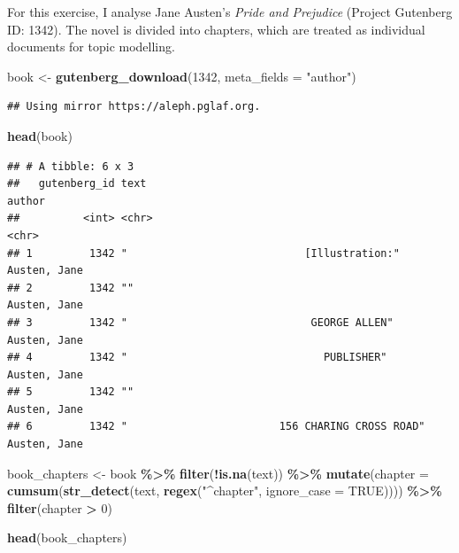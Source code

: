 \documentclass[
]{article}
\newenvironment{Shaded}{\begin{snugshade}}{\end{snugshade}}
\newcommand{\AttributeTok}[1]{\textcolor[rgb]{0.13,0.29,0.53}{#1}}
\newcommand{\ConstantTok}[1]{\textcolor[rgb]{0.56,0.35,0.01}{#1}}
\newcommand{\DecValTok}[1]{\textcolor[rgb]{0.00,0.00,0.81}{#1}}
\newcommand{\FunctionTok}[1]{\textcolor[rgb]{0.13,0.29,0.53}{\textbf{#1}}}
\newcommand{\NormalTok}[1]{#1}
\newcommand{\OtherTok}[1]{\textcolor[rgb]{0.56,0.35,0.01}{#1}}
\newcommand{\SpecialCharTok}[1]{\textcolor[rgb]{0.81,0.36,0.00}{\textbf{#1}}}
\newcommand{\StringTok}[1]{\textcolor[rgb]{0.31,0.60,0.02}{#1}}
\begin{document}
For this exercise, I analyse Jane Austen's \emph{Pride and Prejudice}
(Project Gutenberg ID: 1342). The novel is divided into chapters, which
are treated as individual documents for topic modelling.

\begin{Shaded}
\begin{Highlighting}[]
\NormalTok{book }\OtherTok{\textless{}{-}} \FunctionTok{gutenberg\_download}\NormalTok{(}\DecValTok{1342}\NormalTok{, }\AttributeTok{meta\_fields =} \StringTok{"author"}\NormalTok{)}
\end{Highlighting}
\end{Shaded}

\begin{verbatim}
## Using mirror https://aleph.pglaf.org.
\end{verbatim}

\begin{Shaded}
\begin{Highlighting}[]
\FunctionTok{head}\NormalTok{(book)}
\end{Highlighting}
\end{Shaded}

\begin{verbatim}
## # A tibble: 6 x 3
##   gutenberg_id text                                             author      
##          <int> <chr>                                            <chr>       
## 1         1342 "                            [Illustration:"     Austen, Jane
## 2         1342 ""                                               Austen, Jane
## 3         1342 "                             GEORGE ALLEN"      Austen, Jane
## 4         1342 "                               PUBLISHER"       Austen, Jane
## 5         1342 ""                                               Austen, Jane
## 6         1342 "                        156 CHARING CROSS ROAD" Austen, Jane
\end{verbatim}

\begin{Shaded}
\begin{Highlighting}[]
\NormalTok{book\_chapters }\OtherTok{\textless{}{-}}\NormalTok{ book }\SpecialCharTok{\%\textgreater{}\%}
  \FunctionTok{filter}\NormalTok{(}\SpecialCharTok{!}\FunctionTok{is.na}\NormalTok{(text)) }\SpecialCharTok{\%\textgreater{}\%}
  \FunctionTok{mutate}\NormalTok{(}\AttributeTok{chapter =} \FunctionTok{cumsum}\NormalTok{(}\FunctionTok{str\_detect}\NormalTok{(text, }\FunctionTok{regex}\NormalTok{(}\StringTok{"\^{}chapter"}\NormalTok{, }\AttributeTok{ignore\_case =} \ConstantTok{TRUE}\NormalTok{)))) }\SpecialCharTok{\%\textgreater{}\%}
  \FunctionTok{filter}\NormalTok{(chapter }\SpecialCharTok{\textgreater{}} \DecValTok{0}\NormalTok{)}

\FunctionTok{head}\NormalTok{(book\_chapters)}
\end{Highlighting}
\end{Shaded}
\end{document}
